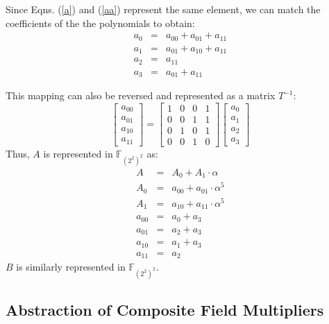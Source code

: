 \begin{Example}
\item Since Eqns. (\ref{a}) and (\ref{aa}) represent the same element, we
  can match the coefficients of the the polynomials to obtain:
\begin{eqnarray}
a_0&=&a_{00}+a_{01}+a_{11} \nonumber \\
a_1&=&a_{01}+a_{10}+a_{11} \nonumber \\
a_2&=&a_{11} \nonumber \\
a_3&=&a_{01}+a_{11} \nonumber
\end{eqnarray}

This mapping can also be reversed and represented as a matrix $T^{-1}$:
\begin{equation}
\begin{bmatrix} a_{00}\\ a_{01} \\a_{10} \\ a_{11}\end{bmatrix}
=
\begin{bmatrix} 1 & 0 & 0 & 1\\ 0 & 0 & 1 & 1\\ 0 & 1 & 0 & 1\\ 0 & 0
  & 1 & 0 \end{bmatrix} 
\begin{bmatrix} a_0\\ a_1 \\a_2 \\ a_3\end{bmatrix}
\end{equation}
Thus, $A$ is represented in $\mathbb{F}_{(2^2)^2}$ as:
\begin{eqnarray}
A&=&A_0+A_1 \cdot \alpha \nonumber \\
A_0&=&a_{00}+a_{01} \cdot \alpha^5 \nonumber \\
A_1&=&a_{10}+a_{11} \cdot \alpha^5 \nonumber \\
a_{00}&=&a_0+a_3 \nonumber \\
a_{01}&=&a_2+a_3 \nonumber \\
a_{10}&=&a_1+a_3 \nonumber \\
a_{11}&=&a_2 \nonumber 
\end{eqnarray}
$B$ is similarly represented in $\mathbb{F}_{(2^2)^2}$.
\end{Example}

\subsection{Abstraction of Composite Field Multipliers}

